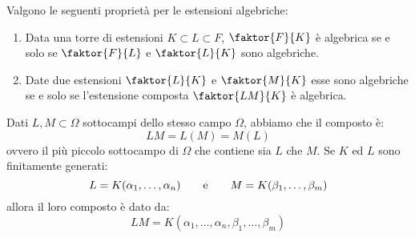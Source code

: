 \documentclass[11pt]{scrartcl}
\begin{document}
\begin{proposition}
    Valgono le seguenti proprietà per le estensioni algebriche:
    \begin{enumerate}[(1)]
        \item Data una torre di estensioni $K \subset L \subset F$, $\faktor{F}{K}$ è algebrica se e solo se $\faktor{F}{L}$ e $\faktor{L}{K}$ sono algebriche.
        \item Date due estensioni $\faktor{L}{K}$ e $\faktor{M}{K}$ esse sono algebriche se e solo se l'estensione composta $\faktor{LM}{K}$ è algebrica.
    \end{enumerate}
\end{proposition}

\begin{remark}
    Dati $L,M \subset \Omega$ sottocampi dello stesso campo $\Omega$, abbiamo che il composto è:
    \[ LM = L(M) = M(L)
        \]
    ovvero il più piccolo sottocampo di $\Omega$ che contiene sia $L$ che $M$. Se $K$ ed $L$ sono finitamente generati:
    \[ L = K(\alpha_1,\ldots,\alpha_n) \qquad \text e \qquad M = K(\beta_1,\ldots,\beta_m)
        \]
    allora il loro composto è dato da:
    \[ LM = K(\alpha_1,\ldots,\alpha_n,\beta_1,\ldots,\beta_m)
        \]
\end{remark}
\end{document}

